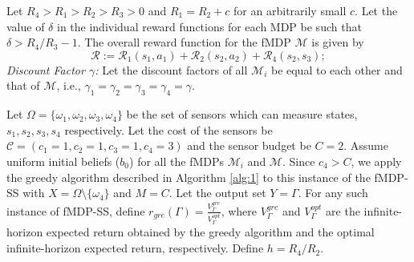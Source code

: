 \documentclass[twocolumn]{autart}    %
\begin{document}
Let $R_4 > R_1 > R_2 > R_3 > 0$ and $R_1 = R_2 + c$ for an arbitrarily small $c$. Let the value of $\delta$ in the individual reward functions for each MDP be such that $\delta > R_4/R_3 -1$. 
The overall reward function for the fMDP $\mathcal{M}$ is given by
\begin{equation}
\label{eq:greedy_value}
\mathcal{R}:= \mathcal{R}_1(s_1,a_1) + \mathcal{R}_2(s_2,a_2) + \mathcal{R}_4(s_2,s_3);
\end{equation}
\textit{Discount Factor $\gamma$:} Let the discount factors of all $\mathcal{M}_i$ be equal to each other and that of $\mathcal{M}$, i.e., $\gamma_1 = \gamma_2 = \gamma_3 = \gamma_4 = \gamma$.

Let $\Omega = \{ \omega_1, \omega_2, \omega_3, \omega_4\}$ be the set of sensors which can measure states, $s_1, s_2,  s_3, s_4$ respectively. Let the cost of the sensors be $\mathcal{C} = (c_1 = 1, c_2 = 1, c_3 = 1, c_4 = 3)$ and the sensor budget be $C=2$. Assume uniform initial beliefs ($b_0$) for all the fMDPs $\mathcal{M}_i$ and $\mathcal{M}$. Since $c_4 > C$,  we apply the greedy algorithm described in Algorithm \ref{alg:1} to this instance of the fMDP-SS with $X = \Omega \setminus \{\omega_4 \}$ and $M=C$. Let the output set $Y = \Gamma$. For any such instance of fMDP-SS, define $r_{gre}(\Gamma) =  \frac{V_{\Gamma}^{gre}}{V_{\Gamma}^{opt}}$,
where $V_{\Gamma}^{gre}$ and $V_{\Gamma}^{opt}$ are the infinite-horizon expected return obtained by the greedy algorithm and the optimal infinite-horizon expected return, respectively. Define $h = R_4/R_2$.\\
\end{document}

